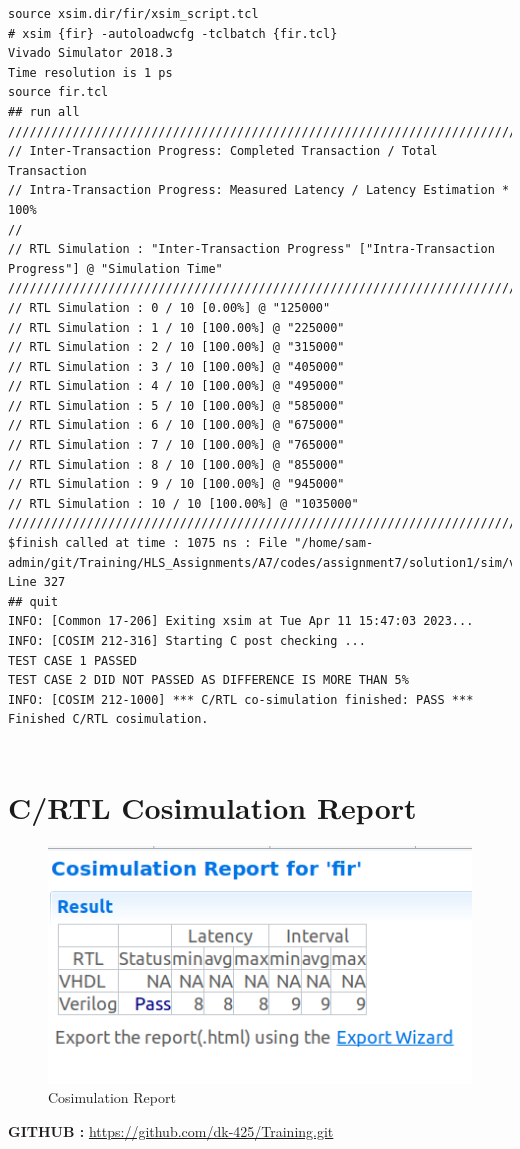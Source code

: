 \documentclass{article}
\begin{document}
\begin{lstlisting}
source xsim.dir/fir/xsim_script.tcl
# xsim {fir} -autoloadwcfg -tclbatch {fir.tcl}
Vivado Simulator 2018.3
Time resolution is 1 ps
source fir.tcl
## run all
////////////////////////////////////////////////////////////////////////////////////
// Inter-Transaction Progress: Completed Transaction / Total Transaction
// Intra-Transaction Progress: Measured Latency / Latency Estimation * 100%
//
// RTL Simulation : "Inter-Transaction Progress" ["Intra-Transaction Progress"] @ "Simulation Time"
////////////////////////////////////////////////////////////////////////////////////
// RTL Simulation : 0 / 10 [0.00%] @ "125000"
// RTL Simulation : 1 / 10 [100.00%] @ "225000"
// RTL Simulation : 2 / 10 [100.00%] @ "315000"
// RTL Simulation : 3 / 10 [100.00%] @ "405000"
// RTL Simulation : 4 / 10 [100.00%] @ "495000"
// RTL Simulation : 5 / 10 [100.00%] @ "585000"
// RTL Simulation : 6 / 10 [100.00%] @ "675000"
// RTL Simulation : 7 / 10 [100.00%] @ "765000"
// RTL Simulation : 8 / 10 [100.00%] @ "855000"
// RTL Simulation : 9 / 10 [100.00%] @ "945000"
// RTL Simulation : 10 / 10 [100.00%] @ "1035000"
////////////////////////////////////////////////////////////////////////////////////
$finish called at time : 1075 ns : File "/home/sam-admin/git/Training/HLS_Assignments/A7/codes/assignment7/solution1/sim/verilog/fir.autotb.v" Line 327
## quit
INFO: [Common 17-206] Exiting xsim at Tue Apr 11 15:47:03 2023...
INFO: [COSIM 212-316] Starting C post checking ...
TEST CASE 1 PASSED 
TEST CASE 2 DID NOT PASSED AS DIFFERENCE IS MORE THAN 5% 
INFO: [COSIM 212-1000] *** C/RTL co-simulation finished: PASS ***
Finished C/RTL cosimulation.


\end{lstlisting}

\section{C/RTL Cosimulation Report}
\vspace{1cm}
\begin{figure}[h]
    \centering
\includegraphics[width=\columnwidth]{figs/4.png}
    \caption{Cosimulation Report}
    \label{fig:my_label}
\end{figure}

\textbf{GITHUB :} \url{https://github.com/dk-425/Training.git}
\end{document}
